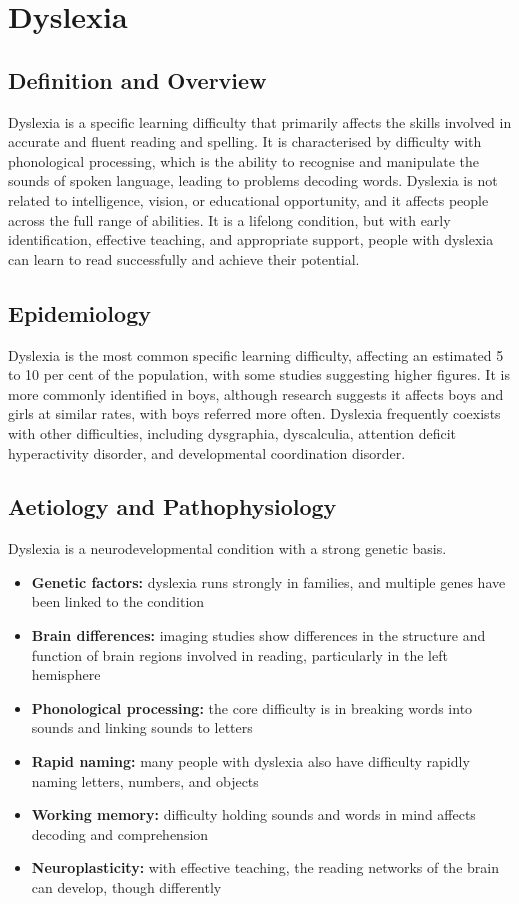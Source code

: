 \chapter{Dyslexia}

\section*{Definition and Overview}
Dyslexia is a specific learning difficulty that primarily affects the skills involved in accurate and fluent reading and spelling. It is characterised by difficulty with phonological processing, which is the ability to recognise and manipulate the sounds of spoken language, leading to problems decoding words. Dyslexia is not related to intelligence, vision, or educational opportunity, and it affects people across the full range of abilities. It is a lifelong condition, but with early identification, effective teaching, and appropriate support, people with dyslexia can learn to read successfully and achieve their potential.

\section*{Epidemiology}
Dyslexia is the most common specific learning difficulty, affecting an estimated 5 to 10 per cent of the population, with some studies suggesting higher figures. It is more commonly identified in boys, although research suggests it affects boys and girls at similar rates, with boys referred more often. Dyslexia frequently coexists with other difficulties, including dysgraphia, dyscalculia, attention deficit hyperactivity disorder, and developmental coordination disorder.

\section*{Aetiology and Pathophysiology}
Dyslexia is a neurodevelopmental condition with a strong genetic basis.
\begin{itemize}
    \item \textbf{Genetic factors:} dyslexia runs strongly in families, and multiple genes have been linked to the condition
    \item \textbf{Brain differences:} imaging studies show differences in the structure and function of brain regions involved in reading, particularly in the left hemisphere
    \item \textbf{Phonological processing:} the core difficulty is in breaking words into sounds and linking sounds to letters
    \item \textbf{Rapid naming:} many people with dyslexia also have difficulty rapidly naming letters, numbers, and objects
    \item \textbf{Working memory:} difficulty holding sounds and words in mind affects decoding and comprehension
    \item \textbf{Neuroplasticity:} with effective teaching, the reading networks of the brain can develop, though differently
\end{itemize}

